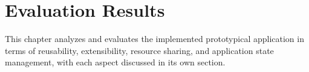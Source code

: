 \chapter{Evaluation Results}
\label{chap:EvaluationResults}
This chapter analyzes and evaluates the implemented prototypical application in terms of reusability, extensibility, resource sharing, and application state management, with each aspect discussed in its own section.




